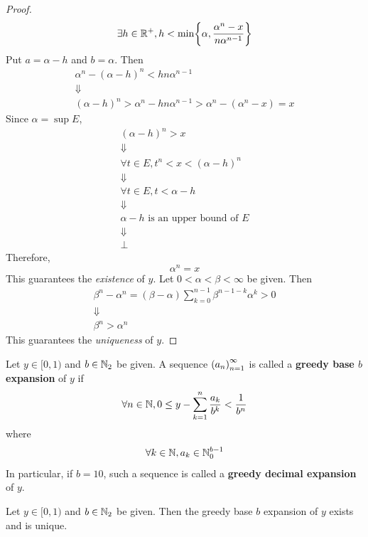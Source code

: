 \begin{proof}
    \[
    \exists h \in \R^{+}, h < \min\set*{\alpha, \frac{\alpha^{n} - x}{n\alpha^{n - 1}}}
    \]
    Put $a = \alpha - h$ and $b = \alpha$. Then
    \[
    \begin{array}{c}
        \alpha^{n} - (\alpha - h)^{n} < hn\alpha^{n - 1} \\
        \Downarrow \\
        (\alpha - h)^{n} > \alpha^{n} - hn\alpha^{n - 1} > \alpha^{n} - (\alpha^{n} - x) = x
    \end{array}
    \]
    Since $\alpha = \sup E$,
    \[
    \begin{array}{c}
        (\alpha - h)^{n} > x \\
        \Downarrow \\
        \forall t \in E, t^{n} < x < (\alpha - h)^{n} \\
        \Downarrow \\
        \forall t \in E, t < \alpha - h \\
        \Downarrow \\
        \alpha - h \text{ is an upper bound of } E \\
        \Downarrow \\
        \bot
    \end{array}
    \]
    Therefore,
    \[
    \alpha^{n} = x
    \]
    This guarantees the \emph{existence} of $y$. Let $0 < \alpha < \beta < \infty$ be given. Then
    \[
    \begin{array}{c}
        \beta^{n} - \alpha^{n} = (\beta - \alpha)\sum_{k = 0}^{n - 1} \beta^{n - 1 - k} \alpha^{k} > 0 \\
        \Downarrow \\
        \beta^{n} > \alpha^{n}
    \end{array}
    \]
    This guarantees the \emph{uniqueness} of $y$.
\end{proof}

\bigskip

\begin{definition} \label{an:def:greedy-base-expansion-of-real-numbers}
    Let $y \in [0, 1)$ and $b \in \N_{2}$ be given. A sequence $\paren*{a_{n}}_{n = 1}^{\infty}$
    is called a \textbf{greedy base $b$ expansion} of $y$ if
    \[
    \forall n \in \N, 0 \leq y - \sum_{k = 1}^{n} \frac{a_{k}}{b^{k}} < \frac{1}{b^{n}}
    \]
    where
    \[
    \forall k \in \N, a_{k} \in \N_{0}^{b - 1}
    \]
    In particular, if $b = 10$, such a sequence is called a \textbf{greedy decimal expansion} of $y$.
\end{definition}

\bigskip

\begin{theorem} \label{an:thm:existence-and-uniqueness-of-greedy-base-expansion}
    Let $y \in [0, 1)$ and $b \in \N_{2}$ be given.
    Then the greedy base $b$ expansion of $y$ exists and is unique.
\end{theorem}
